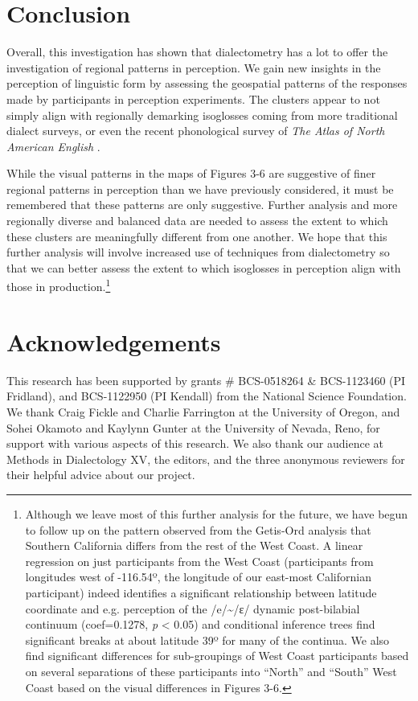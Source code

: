 \documentclass[output=paper]{LSP/langsci}
\begin{document}
\section{Conclusion}
Overall, this investigation has shown that dialectometry has a lot to offer the investigation of regional patterns in perception. We gain new insights in the perception of linguistic form by assessing the geospatial patterns of the responses made by participants in perception experiments. The clusters appear to not simply align with regionally demarking isoglosses coming from more traditional dialect surveys, or even the recent phonological survey of \textit{The Atlas of North American English} \citep{labov_atlas_2006-1}.

\largerpage[-1]
While the visual patterns in the maps of Figures 3-6 are suggestive of finer regional patterns in perception than we have previously considered, it must be remembered that these patterns are only suggestive. Further analysis and more regionally diverse and balanced data are needed to assess the extent to which these clusters are meaningfully different from one another. We hope that this further analysis will involve increased use of techniques from dialectometry so that we can better assess the extent to which isoglosses in perception align with those in production.\footnote{Although we leave most of this further analysis for the future, we have begun to follow up on the pattern observed from the Getis-Ord analysis that Southern California differs from the rest of the West Coast. A linear regression on just participants from the West Coast (participants from longitudes west of -116.54º, the longitude of our east-most Californian participant) indeed identifies a significant relationship between latitude coordinate and e.g. perception of the /e/{\textasciitilde}/ɛ/ dynamic post-bilabial continuum (coef=0.1278, \textit{p} {\textless} 0.05) and conditional inference trees find significant breaks at about latitude 39º for many of the continua. We also find significant differences for sub-groupings of West Coast participants based on several separations of these participants into “North” and “South” West Coast based on the visual differences in Figures 3-6.}

\section*{Acknowledgements}
This research has been supported by grants \# BCS-0518264 \& BCS-1123460 (PI Fridland), and BCS-1122950 (PI Kendall) from the National Science Foundation. We thank Craig Fickle and Charlie Farrington at the University of Oregon, and Sohei Okamoto and Kaylynn Gunter at the University of Nevada, Reno, for support with various aspects of this research. We also thank our audience at Methods in Dialectology XV, the editors, and the three anonymous reviewers for their helpful advice about our project.

\printbibliography[heading=subbibliography,notkeyword=this]
\end{document}
